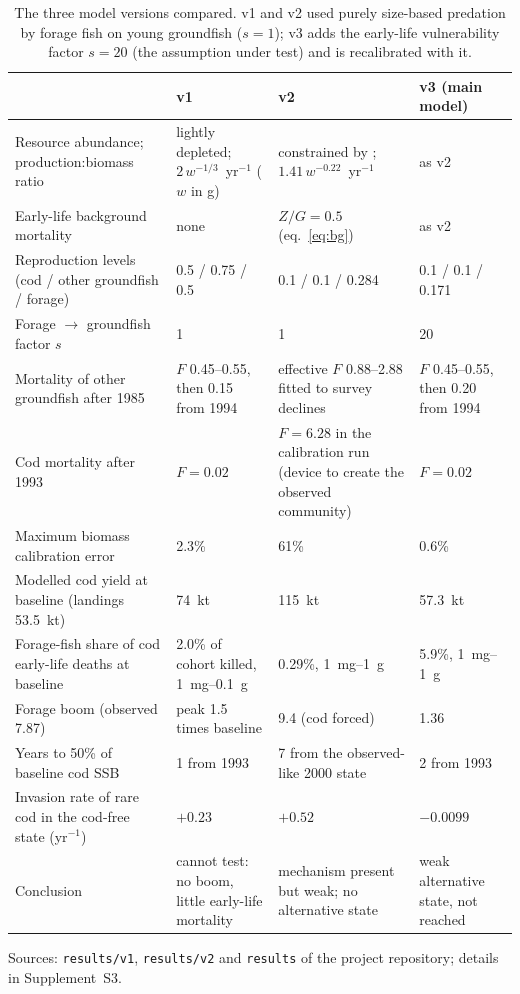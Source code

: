 \documentclass[12pt,letterpaper,fleqn]{article}
\newcommand{\yr}{yr$^{-1}$}
\begin{document}
\clearpage
\begin{table}[p]
\caption{The three model versions compared. v1 and v2 used purely size-based predation by forage fish on young groundfish ($s=1$); v3 adds the early-life vulnerability factor $s=20$ (the assumption under test) and is recalibrated with it.}
\label{tab:versions}
\footnotesize
\begin{tabularx}{\textwidth}{@{}p{}LLL@{}}
\toprule
 & v1 & v2 & v3 (main model)\\
\midrule
Resource abundance; production:biomass ratio & lightly depleted; $2\,w^{-1/3}$~\yr{} ($w$ in g) & constrained by \textcite{bundy2004mass}; $1.41\,w^{-0.22}$~\yr{} & as v2\\
Early-life background mortality & none & $Z/G=0.5$ (eq.~\ref{eq:bg}) & as v2\\
Reproduction levels (cod / other groundfish / forage) & 0.5 / 0.75 / 0.5 & 0.1 / 0.1 / 0.284 & 0.1 / 0.1 / 0.171\\
Forage $\rightarrow$ groundfish factor $s$ & 1 & 1 & 20\\
Mortality of other groundfish after 1985 & $F$ 0.45--0.55, then 0.15 from 1994 & effective $F$ 0.88--2.88 fitted to survey declines & $F$ 0.45--0.55, then 0.20 from 1994\\
Cod mortality after 1993 & $F=0.02$ & $F=6.28$ in the calibration run (device to create the observed community) & $F=0.02$\\
Maximum biomass calibration error & 2.3\% & 61\% & 0.6\%\\
Modelled cod yield at baseline (landings 53.5~kt) & 74~kt & 115~kt & 57.3~kt\\
Forage-fish share of cod early-life deaths at baseline & 2.0\% of cohort killed, 1~mg--0.1~g & 0.29\%, 1~mg--1~g & 5.9\%, 1~mg--1~g\\
Forage boom (observed 7.87) & peak 1.5 times baseline & 9.4 (cod forced) & 1.36\\
Years to 50\% of baseline cod SSB & 1 from 1993 & 7 from the observed-like 2000 state & 2 from 1993\\
Invasion rate of rare cod in the cod-free state (\yr) & $+0.23$ & $+0.52$ & $-0.0099$\\
Conclusion & cannot test: no boom, little early-life mortality & mechanism present but weak; no alternative state & weak alternative state, not reached\\
\bottomrule
\end{tabularx}

\smallskip
\raggedright\footnotesize
Sources: \texttt{results/v1}, \texttt{results/v2} and \texttt{results} of the project repository; details in Supplement~S3.
\end{table}
\end{document}
